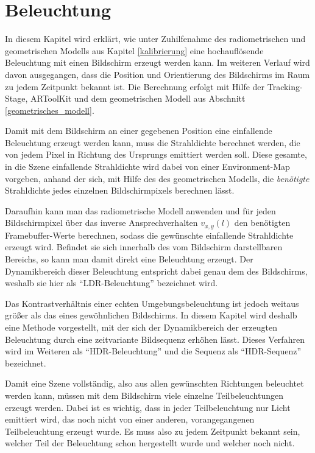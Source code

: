\chapter{Beleuchtung}  \label{beleuchten}
 
 In diesem Kapitel wird erklärt, wie unter Zuhilfenahme des radiometrischen und geometrischen Modells aus Kapitel \ref{kalibrierung} eine hochauflösende Beleuchtung mit einen Bildschirm erzeugt werden kann.
 Im weiteren Verlauf wird davon ausgegangen, dass die Position und Orientierung des Bildschirms im Raum zu jedem Zeitpunkt bekannt ist.
 Die Berechnung erfolgt mit Hilfe der Tracking-Stage, ARToolKit und dem geometrischen Modell aus Abschnitt  \ref{geometrisches_modell}.

 Damit mit dem Bildschirm an einer gegebenen Position eine einfallende Beleuchtung erzeugt werden kann, muss die Strahldichte berechnet werden, die von jedem Pixel in Richtung des Ursprungs emittiert werden soll.
 Diese gesamte, in die Szene einfallende Strahldichte wird dabei von einer Environment-Map vorgeben, anhand der sich, mit Hilfe des des geometrischen Modells, die \emph{benötigte} Strahldichte jedes einzelnen Bildschirmpixels berechnen lässt. 

 Daraufhin kann man das radiometrische Modell anwenden und für jeden Bildschirmpixel über das inverse Ansprechverhalten $v_{x,y}(l)$ den  benötigten Framebuffer-Werte berechnen, sodass die gewünschte einfallende Strahldichte erzeugt wird.
 Befindet sie sich innerhalb des vom Bildschirm darstellbaren Bereichs, so kann  man damit direkt eine Beleuchtung erzeugt.
 Der Dynamikbereich dieser Beleuchtung entspricht dabei genau dem des Bildschirms, weshalb sie hier als ``LDR-Beleuchtung'' bezeichnet wird.
 
 Das Kontrastverhältnis einer echten Umgebungsbeleuchtung ist jedoch weitaus größer als das eines gewöhnlichen Bildschirms. 
 In diesem Kapitel wird deshalb eine Methode vorgestellt, mit der sich der Dynamikbereich der erzeugten Beleuchtung durch eine zeitvariante Bildsequenz erhöhen lässt.
 Dieses Verfahren wird im Weiteren als ``HDR-Beleuchtung'' und die Sequenz als ``HDR-Sequenz'' bezeichnet.
 
 Damit eine Szene vollständig, also aus allen gewünschten Richtungen beleuchtet werden kann, müssen mit dem Bildschirm viele einzelne Teilbeleuchtungen erzeugt werden. 
 Dabei ist es wichtig, dass in jeder Teilbeleuchtung nur Licht emittiert wird, das noch nicht von einer anderen, vorangegangenen Teilbeleuchtung erzeugt wurde. 
 Es muss also zu jedem Zeitpunkt bekannt sein, welcher Teil der Beleuchtung schon hergestellt wurde und welcher noch nicht.

